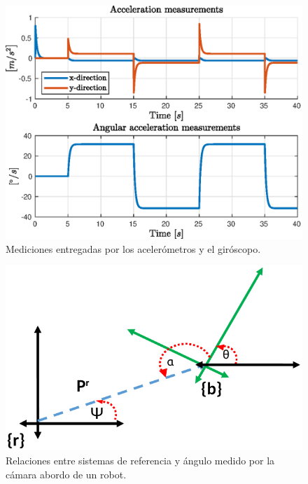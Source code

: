 \begin{figure}[!ht]
	\centering
	\includegraphics[scale=0.8]{includes/1_measurements_ex1.eps}
	\caption{Mediciones entregadas por los acelerómetros y el giróscopo.} \label{1_measurements_ex1}
\end{figure}

\begin{figure}[ht]
	\centering
	\includegraphics[scale=0.7]{includes/4_sistemas_camara.pdf}
	\caption{Relaciones entre sistemas de referencia y ángulo medido por la cámara abordo de un robot.} \label{4_sistemas_camara}
\end{figure}

